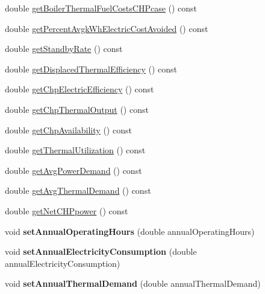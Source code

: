 \begin{DoxyCompactItemize}
\item 
double \hyperlink{class_c_h_p_ace1d96aacf328bd62f01e0eceaae19f6}{get\+Boiler\+Thermal\+Fuel\+Costs\+C\+H\+Pcase} () const
\item 
double \hyperlink{class_c_h_p_ad79607b304d1e50a9421de043b7a9e7b}{get\+Percent\+Avgk\+Wh\+Electric\+Cost\+Avoided} () const
\item 
double \hyperlink{class_c_h_p_a195f0ffe163404077b56a5e5db8eb59c}{get\+Standby\+Rate} () const
\item 
double \hyperlink{class_c_h_p_a66b1b0e6a0d7f3181b3c1dfb590ab523}{get\+Displaced\+Thermal\+Efficiency} () const
\item 
double \hyperlink{class_c_h_p_a1d38e08a7815211361d334263832cad6}{get\+Chp\+Electric\+Efficiency} () const
\item 
double \hyperlink{class_c_h_p_a13e271f59d6315088416123c6e794e09}{get\+Chp\+Thermal\+Output} () const
\item 
double \hyperlink{class_c_h_p_abd1ea13cd48f5af48799891a52634340}{get\+Chp\+Availability} () const
\item 
double \hyperlink{class_c_h_p_aa27fd9e66e208e6b3f28fdfe182d6c32}{get\+Thermal\+Utilization} () const
\item 
double \hyperlink{class_c_h_p_a79f9a97a010669c5ffed9339c54a36c6}{get\+Avg\+Power\+Demand} () const
\item 
double \hyperlink{class_c_h_p_a5f8975488324e4aa3517c9e01334f4bf}{get\+Avg\+Thermal\+Demand} () const
\item 
double \hyperlink{class_c_h_p_a317f3df613b61f401bc5c4b69fddd0cf}{get\+Net\+C\+H\+Ppower} () const
\item 
\mbox{\label{class_c_h_p_a1b9d3ba01f7e243bcde31bd5fdff9e0a}} 
void {\bfseries set\+Annual\+Operating\+Hours} (double annual\+Operating\+Hours)
\item 
\mbox{\label{class_c_h_p_a306aa3de555bb7dbd79e7aeb1658713e}} 
void {\bfseries set\+Annual\+Electricity\+Consumption} (double annual\+Electricity\+Consumption)
\item 
\mbox{\label{class_c_h_p_aa7abaae6cf4d62059eff750498d70076}} 
void {\bfseries set\+Annual\+Thermal\+Demand} (double annual\+Thermal\+Demand)
\item 
\mbox{\label{class_c_h_p_a13c93cd6b6bba4d52b2f8fd10638724e}} 

\end{DoxyCompactItemize}
